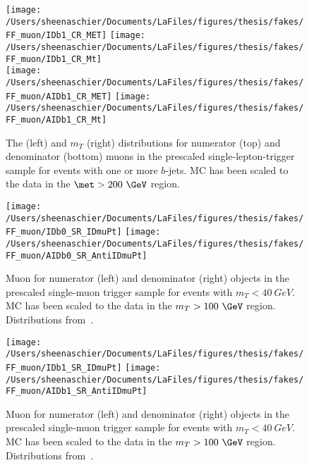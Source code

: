 \begin{figure}[tbp]
  \centering
  \texttt{[image: /Users/sheenaschier/Documents/LaFiles/figures/thesis/fakes/FF\_muon/IDb1\_CR\_MET]}
  \texttt{[image: /Users/sheenaschier/Documents/LaFiles/figures/thesis/fakes/FF\_muon/IDb1\_CR\_Mt]}\\
  \texttt{[image: /Users/sheenaschier/Documents/LaFiles/figures/thesis/fakes/FF\_muon/AIDb1\_CR\_MET]}
  \texttt{[image: /Users/sheenaschier/Documents/LaFiles/figures/thesis/fakes/FF\_muon/AIDb1\_CR\_Mt]}
  \caption{The \met{} (left) and $m_{T}$ (right) distributions for numerator (top) and denominator (bottom) muons in the prescaled single-lepton-trigger sample for events with one or more $b$-jets.  MC has been scaled to the data in the $\met > 200~\GeV$ region.}
  \label{fig:muon_FF_dists_b1}
\end{figure}

\begin{figure}[tbp]
  \centering
  \texttt{[image: /Users/sheenaschier/Documents/LaFiles/figures/thesis/fakes/FF\_muon/IDb0\_SR\_IDmuPt]}
  \texttt{[image: /Users/sheenaschier/Documents/LaFiles/figures/thesis/fakes/FF\_muon/AIDb0\_SR\_AntiIDmuPt]}
  \caption{Muon \pt{} for numerator (left) and denominator (right) objects in the prescaled single-muon trigger sample for events with $m_{T} < 40~ GeV$.  MC has been scaled to the data in the $m_{T} > 100~\GeV$ region. Distributions from~\cite{Boerner:2231917}.}
  \label{fig:muon_FF_dists_pt_b0}
\end{figure}

\begin{figure}[tbp]
  \centering
  \texttt{[image: /Users/sheenaschier/Documents/LaFiles/figures/thesis/fakes/FF\_muon/IDb1\_SR\_IDmuPt]}
  \texttt{[image: /Users/sheenaschier/Documents/LaFiles/figures/thesis/fakes/FF\_muon/AIDb1\_SR\_AntiIDmuPt]}
  \caption{Muon \pt{} for numerator (left) and denominator (right) objects in the prescaled single-muon trigger sample for events with $m_{T}< 40~ GeV$.  MC has been scaled to the data in the $m_{T} > 100~\GeV$ region. Distributions from~\cite{Boerner:2231917}.}
  \label{fig:muon_FF_dists_pt_b1}
\end{figure}



